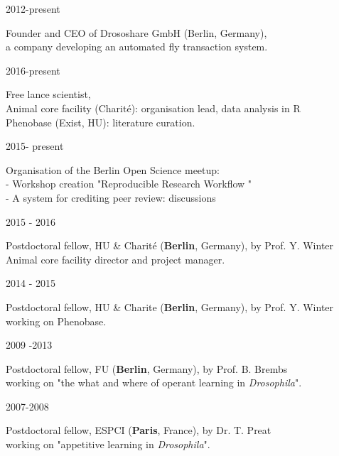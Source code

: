 %
\parbox{0.15\textwidth}{2012-present}\hfill
\parbox[t]{0.83\textwidth}{Founder and CEO 
       of Drososhare GmbH (Berlin, Germany),\\
        a company developing an automated fly transaction system.}

\parbox{0.15\textwidth}{2016-present}\hfill
\parbox[t]{0.83\textwidth}{Free lance scientist,\\
        Animal core facility (Charit\'e): organisation lead, data analysis in R\\
        Phenobase (Exist, HU): literature curation.}
  
 \parbox{0.15\textwidth}{2015- present}\hfill
\parbox[t]{0.83\textwidth}{Organisation of the Berlin Open Science meetup:\\
- Workshop creation "Reproducible Research Workflow "\\
- A system for crediting peer review: discussions}       
                
%
\parbox{0.15\textwidth}{2015 - 2016}\hfill
\parbox[t]{0.83\textwidth}{Postdoctoral fellow,
       HU \& Charit\'e (\textbf{Berlin}, Germany),
        by Prof. Y. Winter\\
        Animal core facility director and project manager.}
\parbox{0.15\textwidth}{2014 - 2015}\hfill
\parbox[t]{0.83\textwidth}{Postdoctoral fellow,
       HU \& Charite (\textbf{Berlin}, Germany),
        by Prof. Y. Winter\\
        working on Phenobase.}
%
%
\parbox{0.15\textwidth}{2009 -2013}\hfill
\parbox[t]{0.83\textwidth}{Postdoctoral fellow,
       FU (\textbf{Berlin}, Germany),
        by Prof. B. Brembs\\
        working on "the what and where of operant learning in \textit{Drosophila}".}
                \parbox{0.15\textwidth}{2007-2008}\hfill
\parbox[t]{0.83\textwidth}{Postdoctoral fellow,
       ESPCI (\textbf{Paris}, France), by Dr. T. Preat\\
        working on "appetitive learning in \textit{Drosophila}".
        }
        
